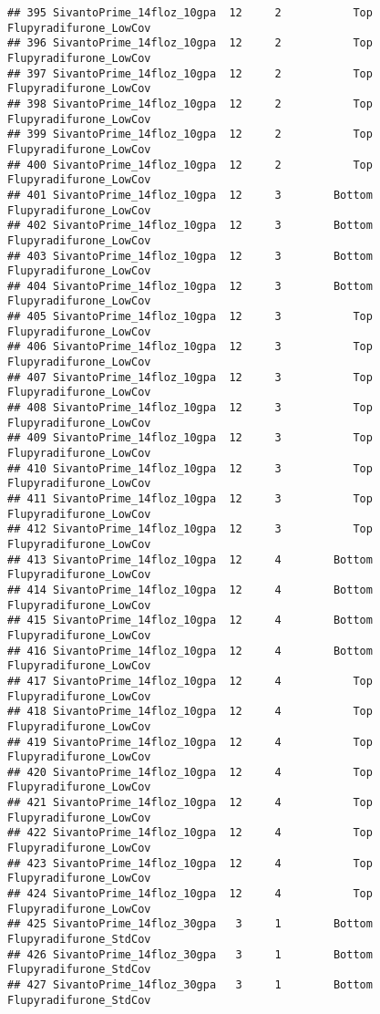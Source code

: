 \documentclass[
]{article}
\begin{document}
\begin{verbatim}
## 395 SivantoPrime_14floz_10gpa  12     2           Top Flupyradifurone_LowCov
## 396 SivantoPrime_14floz_10gpa  12     2           Top Flupyradifurone_LowCov
## 397 SivantoPrime_14floz_10gpa  12     2           Top Flupyradifurone_LowCov
## 398 SivantoPrime_14floz_10gpa  12     2           Top Flupyradifurone_LowCov
## 399 SivantoPrime_14floz_10gpa  12     2           Top Flupyradifurone_LowCov
## 400 SivantoPrime_14floz_10gpa  12     2           Top Flupyradifurone_LowCov
## 401 SivantoPrime_14floz_10gpa  12     3        Bottom Flupyradifurone_LowCov
## 402 SivantoPrime_14floz_10gpa  12     3        Bottom Flupyradifurone_LowCov
## 403 SivantoPrime_14floz_10gpa  12     3        Bottom Flupyradifurone_LowCov
## 404 SivantoPrime_14floz_10gpa  12     3        Bottom Flupyradifurone_LowCov
## 405 SivantoPrime_14floz_10gpa  12     3           Top Flupyradifurone_LowCov
## 406 SivantoPrime_14floz_10gpa  12     3           Top Flupyradifurone_LowCov
## 407 SivantoPrime_14floz_10gpa  12     3           Top Flupyradifurone_LowCov
## 408 SivantoPrime_14floz_10gpa  12     3           Top Flupyradifurone_LowCov
## 409 SivantoPrime_14floz_10gpa  12     3           Top Flupyradifurone_LowCov
## 410 SivantoPrime_14floz_10gpa  12     3           Top Flupyradifurone_LowCov
## 411 SivantoPrime_14floz_10gpa  12     3           Top Flupyradifurone_LowCov
## 412 SivantoPrime_14floz_10gpa  12     3           Top Flupyradifurone_LowCov
## 413 SivantoPrime_14floz_10gpa  12     4        Bottom Flupyradifurone_LowCov
## 414 SivantoPrime_14floz_10gpa  12     4        Bottom Flupyradifurone_LowCov
## 415 SivantoPrime_14floz_10gpa  12     4        Bottom Flupyradifurone_LowCov
## 416 SivantoPrime_14floz_10gpa  12     4        Bottom Flupyradifurone_LowCov
## 417 SivantoPrime_14floz_10gpa  12     4           Top Flupyradifurone_LowCov
## 418 SivantoPrime_14floz_10gpa  12     4           Top Flupyradifurone_LowCov
## 419 SivantoPrime_14floz_10gpa  12     4           Top Flupyradifurone_LowCov
## 420 SivantoPrime_14floz_10gpa  12     4           Top Flupyradifurone_LowCov
## 421 SivantoPrime_14floz_10gpa  12     4           Top Flupyradifurone_LowCov
## 422 SivantoPrime_14floz_10gpa  12     4           Top Flupyradifurone_LowCov
## 423 SivantoPrime_14floz_10gpa  12     4           Top Flupyradifurone_LowCov
## 424 SivantoPrime_14floz_10gpa  12     4           Top Flupyradifurone_LowCov
## 425 SivantoPrime_14floz_30gpa   3     1        Bottom Flupyradifurone_StdCov
## 426 SivantoPrime_14floz_30gpa   3     1        Bottom Flupyradifurone_StdCov
## 427 SivantoPrime_14floz_30gpa   3     1        Bottom Flupyradifurone_StdCov

\end{verbatim}
\end{document}
